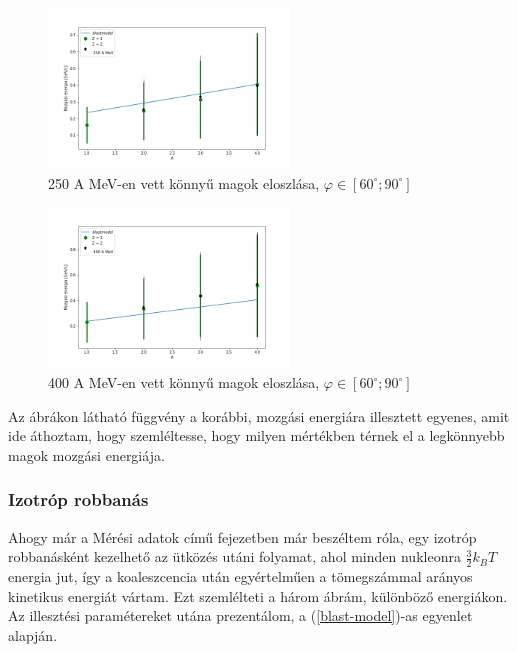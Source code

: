\documentclass[a4paper,12pt]{article}
\begin{document}
\begin{figure}[!htb]
\centering
\includegraphics[width=0.57\textwidth]{./konnyu_magok_250AMeV.png}
\caption{250 A MeV-en vett könnyű magok eloszlása, $\varphi \in [60^{\circ};90^{\circ}]$}
\end{figure}

\vspace{5mm}

\begin{figure}[!htb]
\centering
\includegraphics[width=0.57\textwidth]{./konnyu_magok_400AMeV.png}
\caption{400 A MeV-en vett könnyű magok eloszlása, $\varphi \in [60^{\circ};90^{\circ}]$}
\end{figure}

\vspace{5mm}

\par Az ábrákon látható függvény a korábbi, mozgási energiára illesztett egyenes, amit ide áthoztam, hogy szemléltesse, hogy milyen mértékben térnek el a legkönnyebb magok mozgási energiája.

\subsubsection{ Izotróp robbanás}

\vspace{5mm}

\par Ahogy már a Mérési adatok című fejezetben már beszéltem róla, egy izotróp robbanásként kezelhető az ütközés utáni folyamat, ahol minden nukleonra $\frac{3}{2}k_{B}T$ energia jut, így a koaleszcencia után egyértelműen a tömegszámmal arányos kinetikus energiát vártam. Ezt szemlélteti a három ábrám, különböző energiákon. Az illesztési paramétereket utána prezentálom, a (\ref{blast-model})-as egyenlet alapján.
\end{document}
